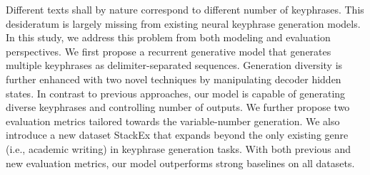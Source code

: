 Different texts shall by nature correspond to different number of keyphrases. This desideratum is largely missing from existing neural keyphrase generation models. In this study, we address this problem from both modeling and evaluation perspectives. We first propose a recurrent generative model that generates multiple keyphrases as delimiter-separated sequences. Generation diversity is further enhanced with two novel techniques by manipulating decoder hidden states. In contrast to previous approaches, our model is capable of generating diverse keyphrases and controlling number of outputs. We further propose two evaluation metrics tailored towards the variable-number generation. We also introduce a new dataset StackEx that expands beyond the only existing genre (i.e., academic writing) in keyphrase generation tasks. With both previous and new evaluation metrics, our model outperforms strong baselines on all datasets.
